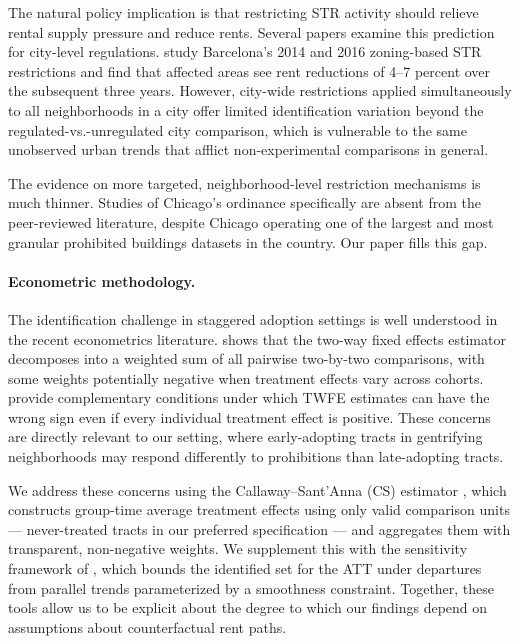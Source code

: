 The natural policy implication is that restricting STR activity should relieve rental supply pressure and reduce rents. Several papers examine this prediction for city-level regulations. \citet{garcia-lopez2020airbnb} study Barcelona's 2014 and 2016 zoning-based STR restrictions and find that affected areas see rent reductions of 4--7 percent over the subsequent three years. However, city-wide restrictions applied simultaneously to all neighborhoods in a city offer limited identification variation beyond the regulated-vs.-unregulated city comparison, which is vulnerable to the same unobserved urban trends that afflict non-experimental comparisons in general.

The evidence on more targeted, neighborhood-level restriction mechanisms is much thinner. Studies of Chicago's ordinance specifically are absent from the peer-reviewed literature, despite Chicago operating one of the largest and most granular prohibited buildings datasets in the country. Our paper fills this gap.

\paragraph{Econometric methodology.} The identification challenge in staggered adoption settings is well understood in the recent econometrics literature. \citet{goodman-bacon2021difference} shows that the two-way fixed effects estimator decomposes into a weighted sum of all pairwise two-by-two comparisons, with some weights potentially negative when treatment effects vary across cohorts. \citet{de-chaisemartin2020two} provide complementary conditions under which TWFE estimates can have the wrong sign even if every individual treatment effect is positive. These concerns are directly relevant to our setting, where early-adopting tracts in gentrifying neighborhoods may respond differently to prohibitions than late-adopting tracts.

We address these concerns using the Callaway--Sant'Anna (CS) estimator \citep{callaway2021difference}, which constructs group-time average treatment effects using only valid comparison units --- never-treated tracts in our preferred specification --- and aggregates them with transparent, non-negative weights. We supplement this with the sensitivity framework of \citet{rbs2023}, which bounds the identified set for the ATT under departures from parallel trends parameterized by a smoothness constraint. Together, these tools allow us to be explicit about the degree to which our findings depend on assumptions about counterfactual rent paths.

